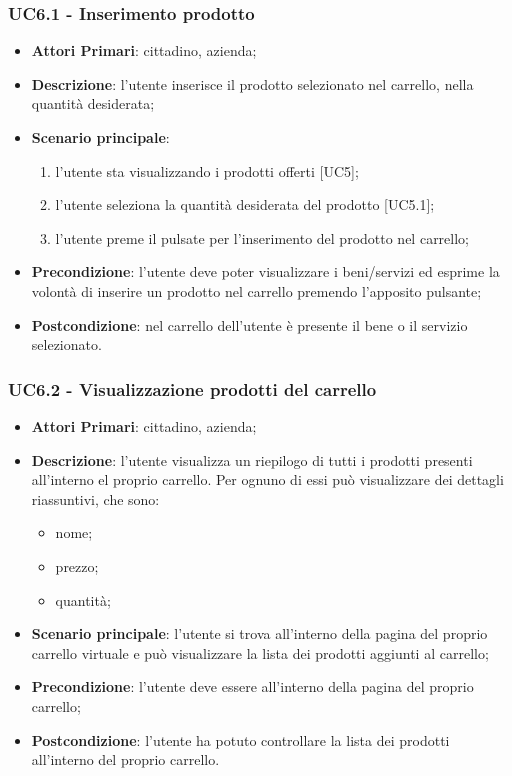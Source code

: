  \subsubsection{UC6.1 - Inserimento prodotto}
\begin{itemize}
	\item \textbf{Attori Primari}: cittadino, azienda\glo;
	\item \textbf{Descrizione}: l'utente inserisce il prodotto selezionato nel carrello, nella quantità desiderata;
	\item \textbf{Scenario principale}:
	\begin{enumerate}[label=\alph*.]
		\item l'utente sta visualizzando i prodotti offerti [UC5];
		\item l'utente seleziona la quantità desiderata del prodotto [UC5.1];
		\item l'utente preme il pulsate per l'inserimento del prodotto nel carrello;
	\end{enumerate}
	\item \textbf{Precondizione}: l'utente deve poter visualizzare i beni/servizi ed esprime la volontà di inserire un prodotto nel carrello premendo l'apposito pulsante;
	\item \textbf{Postcondizione}: nel carrello dell'utente è presente il bene o il servizio selezionato.
\end{itemize}
\subsubsection{UC6.2 - Visualizzazione prodotti del carrello}
\begin{itemize}
	\item \textbf{Attori Primari}: cittadino, azienda\glo;
	\item \textbf{Descrizione}: l'utente visualizza un riepilogo di tutti i prodotti presenti all'interno el proprio carrello. Per ognuno di essi può visualizzare dei dettagli riassuntivi, che sono:
	\begin{itemize}
		\item nome;
		\item prezzo; 
		\item quantità;
	\end{itemize}
	\item \textbf{Scenario principale}: l'utente si trova all'interno della pagina del proprio carrello virtuale e può visualizzare la lista dei prodotti aggiunti al carrello;
	\item \textbf{Precondizione}: l'utente deve essere all'interno della pagina del proprio carrello;
	\item \textbf{Postcondizione}: l'utente ha potuto controllare la lista dei prodotti all'interno del proprio carrello.
\end{itemize}
